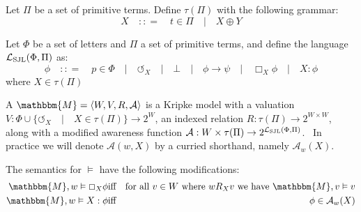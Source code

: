 \begin{definition}
  Let $\Pi$ be a set of primitive terms.  Define $\tau (\Pi)$ with the
  following grammar:
  \[ X \hspace{1em} : : = \hspace{1em} t \in \Pi \hspace{1em} | \hspace{1em} X
     \oplus Y \]
  
  
  Let $\Phi$ be a set of letters and $\Pi$ a set of primitive terms, and
  define the language $\mathcal{L}_{\operatorname{SJL}} (\Phi, \Pi)$ as:
  \[ \phi \hspace{1em} : : = \hspace{1em} p \in \Phi \hspace{1em} |
     \hspace{1em} \circlearrowleft_X \hspace{1em} | \hspace{1em} \bot
     \hspace{1em} | \hspace{1em} \phi \rightarrow \psi \hspace{1em} |
     \hspace{1em} \Box_X \phi \hspace{1em} | \hspace{1em} X : \phi \]
  where $X \in \tau (\Pi)$
\end{definition}

\begin{definition}
  \label{justmodels}A {} $\mathbbm{M}=
  \langle W, V, R, \mathcal{A} \rangle$ is a Kripke model with a valuation $V
  : \Phi \cup \{\circlearrowleft_X \hspace{1em} | \hspace{1em} X \in \tau
  (\Pi)\} \rightarrow 2^W$, an indexed relation $R : \tau (\Pi) \rightarrow
  2^{W \times W}$, along with a modified awareness function $\mathcal{A} : W
  \times \tau (\Pi) \rightarrow 2^{\mathcal{L}_{\operatorname{SJL}} (\Phi, \Pi)}$. \
  In practice we will denote $\mathcal{A} (w, X)$ by a curried shorthand,
  namely $\mathcal{A}_w (X)$.
  
  
  
  The semantics for $\vDash$ have the following modifications:
  \begin{eqnarray*}
    \mathbbm{M}, w \vDash \Box_X \phi & \text{iff} & \text{for all $v \in W$
    where $w R_X v$ we have $\mathbbm{M}, v \vDash v$}\\
    \mathbbm{M}, w \vDash X : \phi & \text{iff} & \phi \in \mathcal{A}_w (X)
  \end{eqnarray*}
\end{definition}

